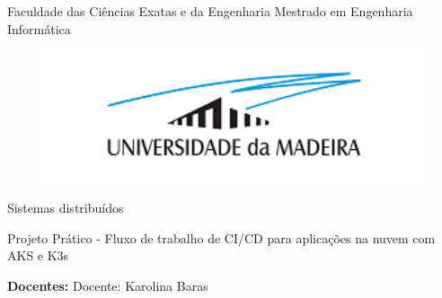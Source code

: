 \documentclass[12pt,a4paper]{article}
\begin{document}
    \begin{titlepage}
        \centering

        \vspace{1cm}%

        \par{%
            \large %
            Faculdade das Ciências Exatas e da Engenharia
            \newline \normalsize Mestrado em Engenharia Informática
        }

        \begin{center}
            \begin{figure}[h]
                \includegraphics[width=13cm]{Images/UniversityLogo/LogoUniversidade.png}
            \end{figure}
        \end{center}

        \par{
            \Centering
            \normalsize Sistemas distribuídos
        }

        \vspace{1.5cm}

        \par{
            \Centering
            \large
            Projeto Prático - Fluxo de trabalho de CI/CD para aplicações na nuvem com AKS e K3s
        }

        \vspace{3cm}

        \begin{multicols}{2} %

            \raggedright

                \par{
                    \normalsize
                    \textbf{Docentes:} \newline
                        \-\hspace{3ex}Docente: Karolina Baras \newline

}
\end{multicols}
\end{titlepage}
\end{document}
